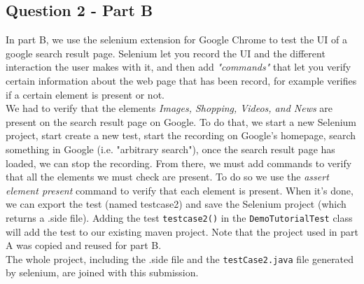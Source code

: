 \newpage
\subsection*{Question 2 - Part B}

\noindent In part B, we use the selenium extension for Google Chrome to test the UI of a google search result page. Selenium let you record the UI and the different interaction the user makes with it, and then add \textit{"commands"} that let you verify certain information about the web page that has been record, for example verifies if a certain element is present or not. \\ We had to verify that the elements \textit{Images, Shopping, Videos, and News} are present on the search result page on Google. To do that, we start a new Selenium project, start create a new test, start the recording on Google's homepage, search something in Google (i.e. "arbitrary search"), once the search result page has loaded, we can stop the recording. From there, we must add commands to verify that all the elements we must check are present. To do so we use the \textit{assert element present} command to verify that each element is present. When it's done, we can export the test (named testcase2) and save the Selenium project (which returns a .side file). Adding the test \verb|testcase2()| in the \verb|DemoTutorialTest| class will add the test to our existing maven project. Note that the project used in part A was copied and reused for part B. \\ The whole project, including the .side file and the \verb|testCase2.java| file generated by selenium, are joined with this submission. 